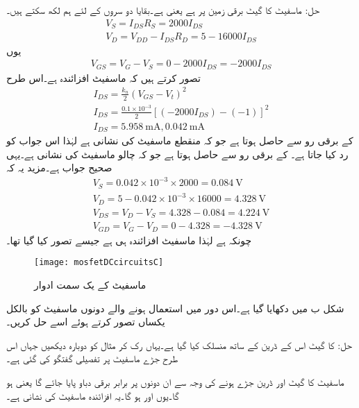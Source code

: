 حل:	ماسفیٹ کا گیٹ برقی زمین پر ہے یعنی  ہے۔بقایا دو سروں کے لئے ہم لکھ سکتے ہیں۔
\begin{align*}
V_S=I_{DS}R_S =2000I_{DS}\\
V_D=V_{DD}-I_{DS}R_D=5-16000 I_{DS}
\end{align*}
یوں
\begin{align*}
V_{GS}=V_G-V_S=0-2000I_{DS}=-2000I_{DS}
\end{align*}
تصور کرتے ہیں کہ ماسفیٹ افزائندہ ہے۔اس طرح
\begin{align*}
I_{DS}=\frac{k_n}{2}\left(V_{GS}-V_t \right )^2 \\
I_{DS}=\frac{0.1 \times 10^{-3}}{2} \left[\left(-2000I_{DS} \right )-(-1) \right ]^2 \\
I_{DS}=\SI{5.958}{\milli \ampere}, \SI{0.042}{\milli \ampere}
\end{align*}
  کے برقی رو سے   حاصل ہوتا ہے جو کہ منقطع ماسفیٹ کی نشانی ہے لہٰذا اس جواب کو رد کیا جاتا ہے۔  کے برقی رو سے  حاصل ہوتا ہے جو کہ چالو ماسفیٹ کی نشانی ہے۔یہی صحیح جواب ہے۔مزید یہ کہ
\begin{align*}
V_S=0.042 \times 10^{-3} \times 2000=\SI{0.084}{\volt}\\
V_D=5-0.042 \times 10^{-3} \times 16000=\SI{4.328}{\volt}\\
V_{DS}=V_D-V_S=4.328-0.084=\SI{4.224}{ \volt}\\
V_{GD}=V_G-V_D=0-4.328=\SI{-4.328}{\volt}
\end{align*}
چونکہ   ہے لہٰذا ماسفیٹ افزائندہ ہی ہے جیسے تصور کیا گیا تھا۔
\begin{figure}
\centering
\texttt{[image: mosfetDCcircuitsC]}
\caption{ماسفیٹ کے یک سمت ادوار}
\label{شکل_ماسفیٹ_کے_یک_سمتی_ادوار_پ}
\end{figure}

شکل  ب میں   دکھایا گیا ہے۔اس دور میں استعمال ہونے والے دونوں ماسفیٹ کو بالکل یکساں تصور کرتے ہوئے اسے حل کریں۔

حل:  کا گیٹ اس کے ڈرین کے ساتھ منسلک کیا گیا ہے۔یہاں رک کر مثال   کو دوبارہ دیکھیں جہاں اس طرح جڑے ماسفیٹ پر تفصیلی گفتگو کی گئی ہے۔

ماسفیٹ کا گیٹ اور ڈرین جڑے ہونے کی وجہ سے ان دونوں پر برابر برقی دباو پایا جائے گا یعنی  ہو گا۔یوں  اور   ہو گا۔یہ افزائندہ ماسفیٹ کی نشانی ہے۔

